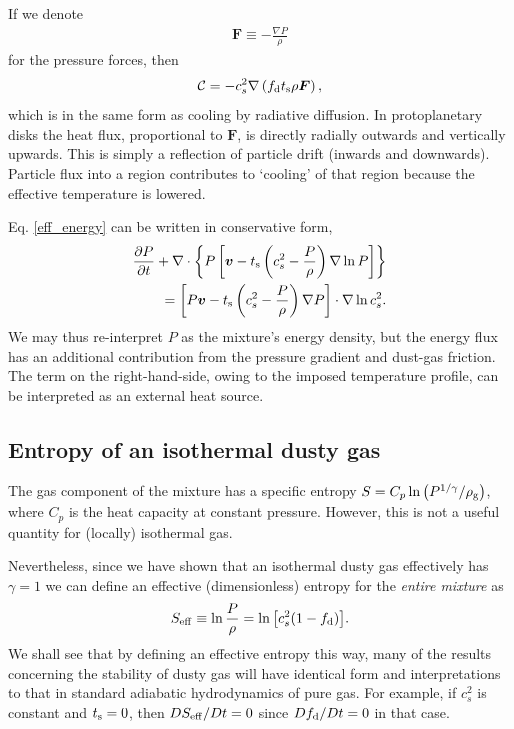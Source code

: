 If we denote 
\begin{align}
  \bm{F} \equiv  - \frac{\nabla P}{\rho}
\end{align}
for the pressure forces, then
\begin{align*}
  \mathcal{C} = - c_s^2\nabla \left( f_\mathrm{d} t_\mathrm{s} \rho \bm{F}
  \right), 
\end{align*}
which is in the same form as cooling by radiative diffusion. In protoplanetary
disks the heat flux, proportional to $\bm{F}$, is directly radially
outwards and vertically upwards. This is simply a reflection of
particle drift (inwards and downwards). Particle flux into a region contributes
to `cooling' of that region because the effective temperature is
lowered. 

Eq. \ref{eff_energy} can be written in conservative form,
\begin{align*}
  \frac{\partial P}{ \partial t} + \nabla\cdot\left\{P\left[\bm{v} -
      t_\mathrm{s}\left(c_s^2 - \frac{P}{\rho}\right)\nabla\ln{P}\right]
    \right\}\\
  = \left[P\bm{v} - t_\mathrm{s}\left(c_s^2 - \frac{P}{\rho}\right)\nabla
    P\right]\cdot\nabla\ln{c_s^2}. 
\end{align*} 
We may thus re-interpret $P$ as the mixture's energy density, but the
energy flux has an additional contribution from the pressure
gradient and dust-gas friction. The term on the right-hand-side, owing
to the imposed temperature profile, can be interpreted as an external
heat source.  


\subsection{Entropy of an isothermal dusty gas }

The gas component of the mixture has a specific entropy
$S = C_p\ln{\left(P^{1/\gamma}/\rho_\mathrm{g}\right)}$, where $C_p$ is the heat capacity at constant
pressure. However, this is not a useful quantity for (locally)
isothermal gas. 

Nevertheless, since we have shown that an isothermal dusty gas
effectively has $\gamma=1$ we can define an effective (dimensionless)  
entropy for the \emph{entire mixture} as 
\begin{align}
   S_\mathrm{eff} \equiv \ln \frac{P}{\rho} = \ln{\left[c_s^2(1-f_\mathrm{d})\right]}.  
\end{align} 
We shall see that by defining an effective entropy this way, many of the 
results concerning the stability of dusty gas will have identical form
and interpretations to that in standard adiabatic hydrodynamics of 
pure gas. For example, if $c_s^2$ is constant and $t_\mathrm{s}=0$, then
$DS_\mathrm{eff}/ D t = 0$ since $Df_\mathrm{d}/D t=0$ in that case.  


